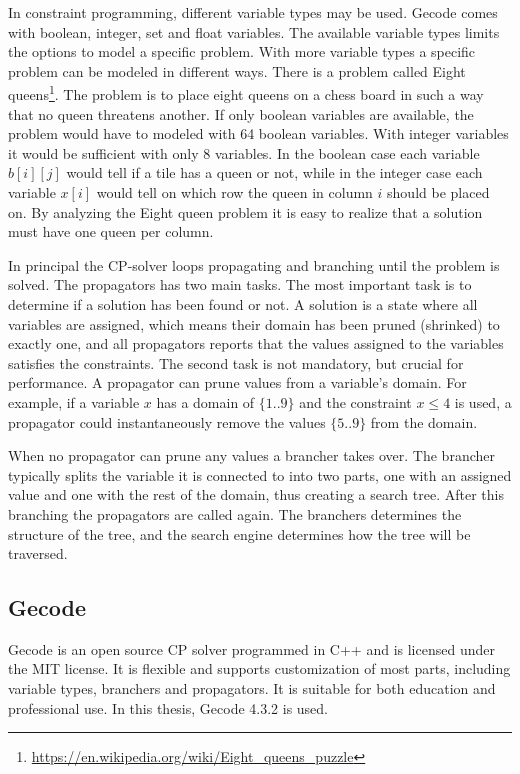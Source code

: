 \documentclass[a4paper,11pt]{article}
\begin{document}
In constraint programming, different variable types may be used. Gecode comes with boolean, integer, set and float variables. The available variable types limits the options to model a specific problem. With more variable types a specific problem can be modeled in different ways. There is a problem called Eight queens\footnote{\url{https://en.wikipedia.org/wiki/Eight_queens_puzzle}}. The problem is to place eight queens on a chess board in such a way that no queen threatens another. If only boolean variables are available, the problem would have to modeled with 64 boolean variables. With integer variables it would be sufficient with only 8 variables. In the boolean case each variable $b[i][j]$ would tell if a tile has a queen or not, while in the integer case each variable $x[i]$ would tell on which row the queen in column $i$ should be placed on. By analyzing the Eight queen problem it is easy to realize that a solution must have one queen per column.

In principal the CP-solver loops propagating and branching until the problem is solved. The propagators has two main tasks. The most important task is to determine if a solution has been found or not. A solution is a state where all variables are assigned, which means their domain has been pruned (shrinked) to exactly one, and all propagators reports that the values assigned to the variables satisfies the constraints. The second task is not mandatory, but crucial for performance. A propagator can prune values from a variable's domain. For example, if a variable $x$ has a domain of $\{1..9\}$ and the constraint $x\le 4$ is used, a propagator could instantaneously remove the values $\{5..9\}$ from the domain.

When no propagator can prune any values a brancher takes over. The brancher typically splits the variable it is connected to into two parts, one with an assigned value and one with the rest of the domain, thus creating a search tree. After this branching the propagators are called again. The branchers determines the structure of the tree, and the search engine determines how the tree will be traversed. 

\subsection{Gecode}
Gecode is an open source CP solver programmed in C++ and is licensed under the MIT license. It is flexible and supports customization of most parts, including variable types, branchers and propagators. It is suitable for both education and professional use. In this thesis, Gecode 4.3.2 is used.
\end{document}
